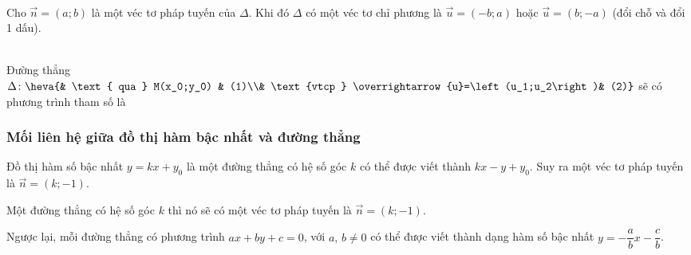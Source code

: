 \iconMT {} \\
Cho $\vec{n}=(a;b)$ là một véc tơ pháp tuyến của $\Delta$. Khi đó $\Delta$ có một véc tơ chỉ phương là $\vec{u}=(-b;a)$ hoặc $\vec{u}=(b;-a)$ (đổi chỗ và đổi 1 dấu).

\vspace{0.8cm}

\iconMT {} \\
Đường thẳng $\Delta \colon \heva{& \text{ qua } M(x_0;y_0) & (1)\\& \text{vtcp } \overrightarrow{u}=\left(u_1;u_2\right)& (2)}$ sẽ có phương trình tham số là 

\subsubsection{Mối liên hệ giữa đồ thị hàm bậc nhất và đường thẳng}
\begin{listEX}[1]
	\item [\ding{172}] Đồ thị hàm số bậc nhất $y=kx+y_0$ là một đường thẳng có hệ số góc $k$ có thể được viết thành $kx-y+y_0$. Suy ra một véc tơ pháp tuyến là $\vec{n}=(k;-1)$.
	\begin{boxdn}
		 Một đường thẳng có hệ số góc $k$ thì nó sẽ có một véc tơ pháp tuyến là $\vec{n}=(k;-1)$.
	\end{boxdn}
	\vspace{0.8cm}
	\item [\ding{173}] Ngược lại, mỗi đường thẳng có phương trình $ax+by+c=0$, với $a,\,b \ne 0$ có thể được viết thành dạng hàm số bậc nhất $y=-\dfrac{a}{b}x-\dfrac{c}{b}$.
\end{listEX}

\newpage

